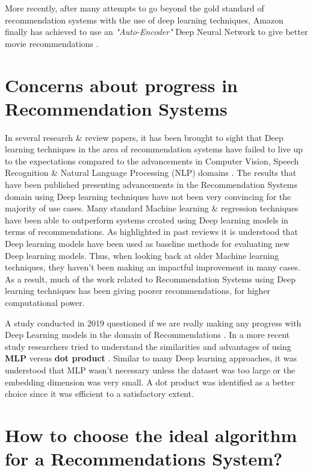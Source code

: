 \documentclass[manuscript,screen,review]{acmart}
\begin{document}
More recently, after many attempts to go beyond the gold standard of recommendation systems \cite{linden_amazoncom_2003, smith_two_2017} with the use of deep learning techniques, Amazon finally has achieved to use an \emph{"Auto-Encoder"} Deep Neural Network to give better movie recommendations \cite{larry_history_2019}.


\section{Concerns about progress in Recommendation Systems}
In several research \& review papers, it has been brought to sight that Deep learning techniques in the area of recommendation systems have failed to live up to the expectations compared to the advancements in Computer Vision, Speech Recognition \& Natural Language Processing (NLP) domains \cite{choi_local_2021}. The results that have been published presenting advancements in the Recommendation Systems domain using Deep learning techniques have not been very convincing for the majority of use cases. Many standard Machine learning \& regression techniques have been able to outperform systems created using Deep learning models in terms of recommendations. As highlighted in past reviews \cite{dacrema_are_2019} it is understood that Deep learning models have been used as baseline methods for evaluating new Deep learning models. Thus, when looking back at older Machine learning techniques, they haven't been making an impactful improvement in many cases. As a result, much of the work related to Recommendation Systems using Deep learning techniques has been giving poorer recommendations, for higher computational power.


A study conducted in 2019 questioned if we are really making any progress with Deep Learning models in the domain of Recommendations \cite{dacrema_are_2019}. In a more recent study researchers tried to understand the similarities and advantages of using \textbf{MLP} versus \textbf{dot product} \cite{rendle_neural_2020}. Similar to many Deep learning approaches, it was understood that MLP wasn't necessary unless the dataset was too large or the embedding dimension was very small. A dot product was identified as a better choice since it was efficient to a satisfactory extent.

\section{How to choose the ideal algorithm for a Recommendations System?}
\end{document}
